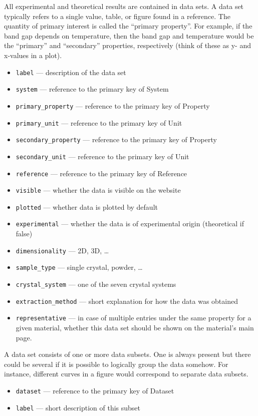 \documentclass{article}
\begin{document}
All experimental and theoretical results are contained in data sets. A data set typically refers to a single value, table, or figure found in a reference. The quantity of primary interest is called the ``primary property''. For example, if the band gap depends on temperature, then the band gap and temperature would be the ``primary'' and ``secondary'' properties, respectively (think of these as y- and x-values in a plot).
\begin{tcolorbox}[colback=green!5,colframe=green!40!black,title=Dataset(Base)]
  \begin{itemize}
  \item \texttt{label} --- description of the data set
  \item \texttt{system} --- reference to the primary key of System
  \item \texttt{primary\_property} --- reference to the primary key of Property
  \item \texttt{primary\_unit} --- reference to the primary key of Unit
  \item \texttt{secondary\_property} --- reference to the primary key of Property
  \item \texttt{secondary\_unit} --- reference to the primary key of Unit
  \item \texttt{reference} --- reference to the primary key of Reference
  \item \texttt{visible} --- whether the data is visible on the website
  \item \texttt{plotted} --- whether data is plotted by default
  \item \texttt{experimental} --- whether the data is of experimental origin (theoretical if false)
  \item \texttt{dimensionality} --- 2D, 3D, \ldots
  \item \texttt{sample\_type} --- single crystal, powder, \ldots
  \item \texttt{crystal\_system} --- one of the seven crystal systems
  \item \texttt{extraction\_method} --- short explanation for how the data was obtained
  \item \texttt{representative} --- in case of multiple entries under the same property for a given material, whether this data set should be shown on the material's main page.
  \end{itemize}
\end{tcolorbox}

A data set consists of one or more data subsets. One is always present but there could be several if it is possible to logically group the data somehow. For instance, different curves in a figure would correspond to separate data subsets.
\begin{tcolorbox}[colback=green!5,colframe=green!40!black,title=Subset(Base)]
  \begin{itemize}
  \item \texttt{dataset} --- reference to the primary key of Dataset
  \item \texttt{label} --- short description of this subset
  \end{itemize}
\end{tcolorbox}
\end{document}
